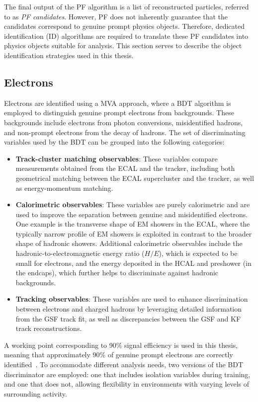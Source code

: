 The final output of the PF algorithm is a list of reconstructed particles, referred to as \textit{PF candidates}. However, PF does not inherently guarantee that the candidates correspond to genuine prompt physics objects. Therefore, dedicated identification (ID) algorithms are required to translate these PF candidates into physics objects suitable for analysis. This section serves to describe the object identification strategies used in this thesis.

\subsection{Electrons}
\label{Section:Electron_Identification}

Electrons are identified using a \ac{MVA} approach, where a \ac{BDT} algorithm is employed to distinguish genuine prompt electrons from backgrounds. These backgrounds include electrons from photon conversions, misidentified hadrons, and non-prompt electrons from the decay of hadrons. The set of discriminating variables used by the BDT can be grouped into the following categories:

\begin{itemize}
    \item \textbf{Track-cluster matching observables}: These variables compare measurements obtained from the ECAL and the tracker, including both geometrical matching between the ECAL supercluster and the tracker, as well as energy-momentum matching.
    \item \textbf{Calorimetric observables}: These variables are purely calorimetric and are used to improve the separation between genuine and misidentified electrons. One example is the transverse shape of EM showers in the ECAL, where the typically narrow profile of EM showers is exploited in contrast to the broader shape of hadronic showers. Additional calorimetric observables include the hadronic-to-electromagnetic energy ratio ($H/E$), which is expected to be small for electrons, and the energy deposited in the HCAL and preshower (in the endcaps), which further helps to discriminate against hadronic backgrounds.
    \item \textbf{Tracking observables}: These variables are used to enhance discrimination between electrons and charged hadrons by leveraging detailed information from the GSF track fit, as well as discrepancies between the GSF and KF track reconstructions.
\end{itemize}

A working point corresponding to 90\% signal efficiency is used in this thesis, meaning that approximately 90\% of genuine prompt electrons are correctly identified~\cite{ElectronID_Performance}. To accommodate different analysis needs, two versions of the BDT discriminator are employed: one that includes isolation variables during training, and one that does not, allowing flexibility in environments with varying levels of surrounding activity. 

